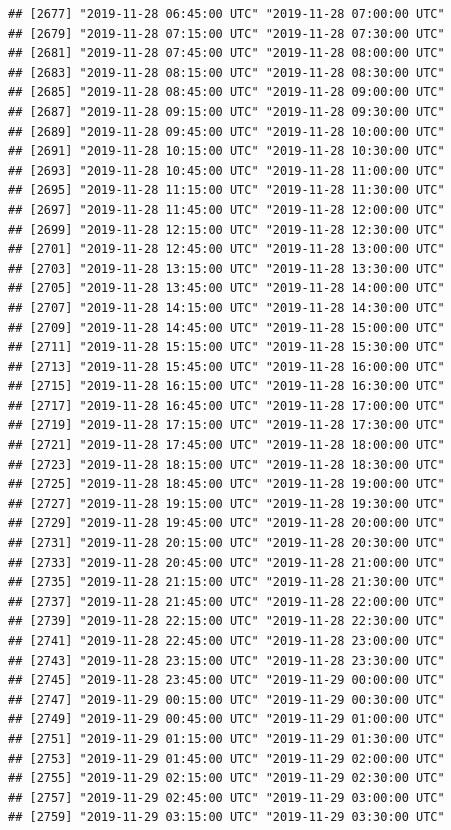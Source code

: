 \documentclass{article}\usepackage[]{graphicx}\usepackage[]{color}
\makeatletter
\newenvironment{kframe}{%
 \def\at@end@of@kframe{}%
 \ifinner\ifhmode%
  \def\at@end@of@kframe{\end{minipage}}%
  \begin{minipage}{\columnwidth}%
 \fi\fi%
 \def\FrameCommand##1{\hskip\@totalleftmargin \hskip-\fboxsep
 \colorbox{shadecolor}{##1}\hskip-\fboxsep
     \hskip-\linewidth \hskip-\@totalleftmargin \hskip\columnwidth}%
 \MakeFramed {\advance\hsize-\width
   \@totalleftmargin\z@ \linewidth\hsize
   \@setminipage}}%
 {\par\unskip\endMakeFramed%
 \at@end@of@kframe}
\newenvironment{knitrout}{}{} %
\makeatother
\begin{document}
\begin{knitrout}
\begin{kframe}
\begin{verbatim}
## [2677] "2019-11-28 06:45:00 UTC" "2019-11-28 07:00:00 UTC"
## [2679] "2019-11-28 07:15:00 UTC" "2019-11-28 07:30:00 UTC"
## [2681] "2019-11-28 07:45:00 UTC" "2019-11-28 08:00:00 UTC"
## [2683] "2019-11-28 08:15:00 UTC" "2019-11-28 08:30:00 UTC"
## [2685] "2019-11-28 08:45:00 UTC" "2019-11-28 09:00:00 UTC"
## [2687] "2019-11-28 09:15:00 UTC" "2019-11-28 09:30:00 UTC"
## [2689] "2019-11-28 09:45:00 UTC" "2019-11-28 10:00:00 UTC"
## [2691] "2019-11-28 10:15:00 UTC" "2019-11-28 10:30:00 UTC"
## [2693] "2019-11-28 10:45:00 UTC" "2019-11-28 11:00:00 UTC"
## [2695] "2019-11-28 11:15:00 UTC" "2019-11-28 11:30:00 UTC"
## [2697] "2019-11-28 11:45:00 UTC" "2019-11-28 12:00:00 UTC"
## [2699] "2019-11-28 12:15:00 UTC" "2019-11-28 12:30:00 UTC"
## [2701] "2019-11-28 12:45:00 UTC" "2019-11-28 13:00:00 UTC"
## [2703] "2019-11-28 13:15:00 UTC" "2019-11-28 13:30:00 UTC"
## [2705] "2019-11-28 13:45:00 UTC" "2019-11-28 14:00:00 UTC"
## [2707] "2019-11-28 14:15:00 UTC" "2019-11-28 14:30:00 UTC"
## [2709] "2019-11-28 14:45:00 UTC" "2019-11-28 15:00:00 UTC"
## [2711] "2019-11-28 15:15:00 UTC" "2019-11-28 15:30:00 UTC"
## [2713] "2019-11-28 15:45:00 UTC" "2019-11-28 16:00:00 UTC"
## [2715] "2019-11-28 16:15:00 UTC" "2019-11-28 16:30:00 UTC"
## [2717] "2019-11-28 16:45:00 UTC" "2019-11-28 17:00:00 UTC"
## [2719] "2019-11-28 17:15:00 UTC" "2019-11-28 17:30:00 UTC"
## [2721] "2019-11-28 17:45:00 UTC" "2019-11-28 18:00:00 UTC"
## [2723] "2019-11-28 18:15:00 UTC" "2019-11-28 18:30:00 UTC"
## [2725] "2019-11-28 18:45:00 UTC" "2019-11-28 19:00:00 UTC"
## [2727] "2019-11-28 19:15:00 UTC" "2019-11-28 19:30:00 UTC"
## [2729] "2019-11-28 19:45:00 UTC" "2019-11-28 20:00:00 UTC"
## [2731] "2019-11-28 20:15:00 UTC" "2019-11-28 20:30:00 UTC"
## [2733] "2019-11-28 20:45:00 UTC" "2019-11-28 21:00:00 UTC"
## [2735] "2019-11-28 21:15:00 UTC" "2019-11-28 21:30:00 UTC"
## [2737] "2019-11-28 21:45:00 UTC" "2019-11-28 22:00:00 UTC"
## [2739] "2019-11-28 22:15:00 UTC" "2019-11-28 22:30:00 UTC"
## [2741] "2019-11-28 22:45:00 UTC" "2019-11-28 23:00:00 UTC"
## [2743] "2019-11-28 23:15:00 UTC" "2019-11-28 23:30:00 UTC"
## [2745] "2019-11-28 23:45:00 UTC" "2019-11-29 00:00:00 UTC"
## [2747] "2019-11-29 00:15:00 UTC" "2019-11-29 00:30:00 UTC"
## [2749] "2019-11-29 00:45:00 UTC" "2019-11-29 01:00:00 UTC"
## [2751] "2019-11-29 01:15:00 UTC" "2019-11-29 01:30:00 UTC"
## [2753] "2019-11-29 01:45:00 UTC" "2019-11-29 02:00:00 UTC"
## [2755] "2019-11-29 02:15:00 UTC" "2019-11-29 02:30:00 UTC"
## [2757] "2019-11-29 02:45:00 UTC" "2019-11-29 03:00:00 UTC"
## [2759] "2019-11-29 03:15:00 UTC" "2019-11-29 03:30:00 UTC"

\end{verbatim}
\end{kframe}
\end{knitrout}
\end{document}
